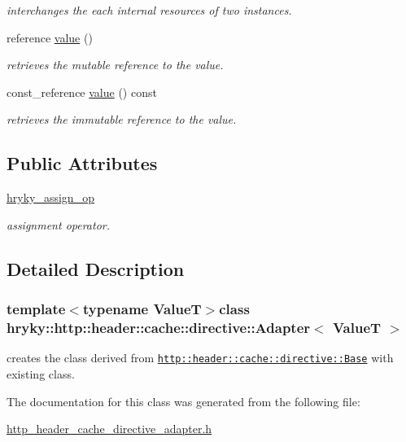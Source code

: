 \begin{DoxyCompactItemize}
\begin{DoxyCompactList}\small\item\em interchanges the each internal resources of two instances. \end{DoxyCompactList}\item 
\hypertarget{classhryky_1_1_adapter_ab736ecd30f215ca3cbd2364f818cb83f}{reference \hyperlink{classhryky_1_1_adapter_ab736ecd30f215ca3cbd2364f818cb83f}{value} ()}\label{classhryky_1_1_adapter_ab736ecd30f215ca3cbd2364f818cb83f}

\begin{DoxyCompactList}\small\item\em retrieves the mutable reference to the value. \end{DoxyCompactList}\item 
\hypertarget{classhryky_1_1_adapter_a5856f2ee6c0622e153f52fbb6ca6bbe9}{const\-\_\-reference \hyperlink{classhryky_1_1_adapter_a5856f2ee6c0622e153f52fbb6ca6bbe9}{value} () const}\label{classhryky_1_1_adapter_a5856f2ee6c0622e153f52fbb6ca6bbe9}

\begin{DoxyCompactList}\small\item\em retrieves the immutable reference to the value. \end{DoxyCompactList}\end{DoxyCompactItemize}
\subsection*{Public Attributes}
\begin{DoxyCompactItemize}
\item 
\hypertarget{classhryky_1_1_adapter_a764c5fe566545047f3acaf18792e5102}{\hyperlink{classhryky_1_1_adapter_a764c5fe566545047f3acaf18792e5102}{hryky\-\_\-assign\-\_\-op}}\label{classhryky_1_1_adapter_a764c5fe566545047f3acaf18792e5102}

\begin{DoxyCompactList}\small\item\em assignment operator. \end{DoxyCompactList}\end{DoxyCompactItemize}


\subsection{Detailed Description}
\subsubsection*{template$<$typename Value\-T$>$class hryky\-::http\-::header\-::cache\-::directive\-::\-Adapter$<$ Value\-T $>$}

creates the class derived from \href{http::header::cache::directive::Base}{\tt http\-::header\-::cache\-::directive\-::\-Base} with existing class. 

The documentation for this class was generated from the following file\-:\begin{DoxyCompactItemize}
\item 
\hyperlink{http__header__cache__directive__adapter_8h}{http\-\_\-header\-\_\-cache\-\_\-directive\-\_\-adapter.\-h}\end{DoxyCompactItemize}
